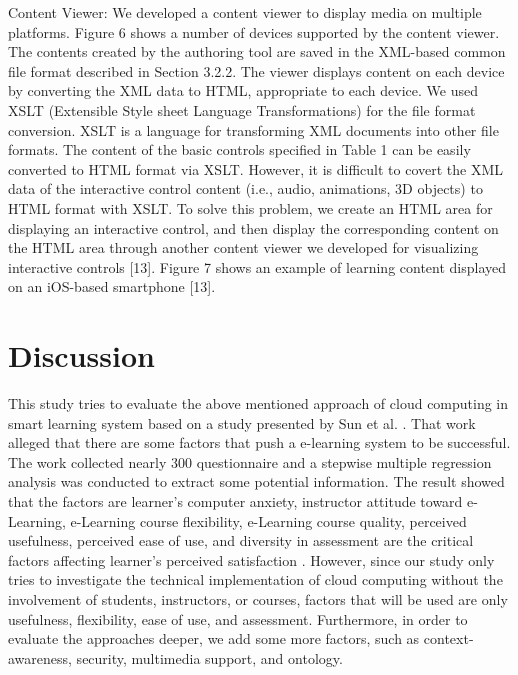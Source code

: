 \documentclass[journal]{vgtc}                %
\begin{document}
  Content Viewer: We developed a content viewer to display media on multiple platforms. Figure 6 shows a number of devices supported by the content viewer. The contents created by the authoring tool are saved in the XML-based common file format described in Section 3.2.2. The viewer displays content on each device by converting the XML data to HTML, appropriate to each device. We used XSLT (Extensible Style sheet Language Transformations) for the file format conversion. XSLT is a language for transforming XML documents into other file formats. The content of the basic controls specified in Table 1 can be easily converted to HTML format via XSLT. However, it is difficult to covert the XML data of the interactive control content (i.e., audio, animations, 3D objects) to HTML format with XSLT. To solve this problem, we create an HTML area for displaying an interactive control, and then display the corresponding content on the HTML area through another content viewer we developed for visualizing interactive controls [13]. Figure 7 shows an example of learning content displayed on an iOS-based smartphone [13].

\section{Discussion}
This study tries to evaluate the above mentioned approach of cloud computing in smart learning system based on a study presented by Sun et al. \cite{Sun2008}. That work alleged that there are some factors that push a e-learning system to be successful. The work collected nearly 300 questionnaire and a stepwise multiple regression analysis was conducted to extract some potential information. The result showed that the factors are learner's computer anxiety, instructor attitude toward e-Learning, e-Learning course flexibility, e-Learning course quality, perceived usefulness, perceived ease of use, and diversity in assessment are the critical factors affecting learner's perceived satisfaction \cite{Sun2008}. However, since our study only tries to investigate the technical implementation of cloud computing without the involvement of students, instructors, or courses, factors that will be used are only usefulness, flexibility, ease of use, and assessment. Furthermore, in order to evaluate the approaches deeper, we add some more factors, such as context-awareness, security, multimedia support, and ontology.
\end{document}
